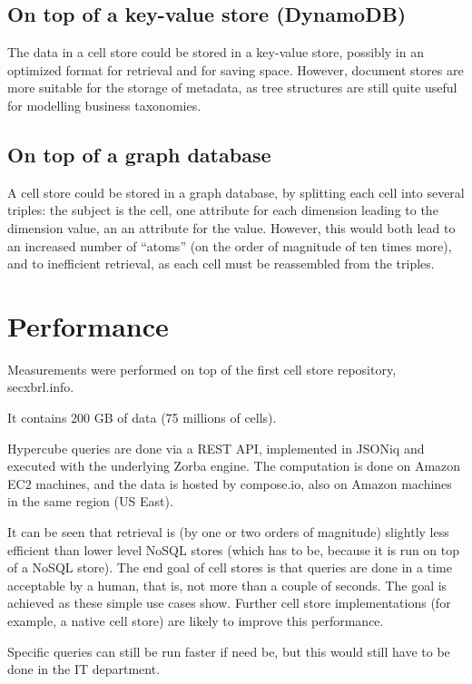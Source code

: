 \documentclass{vldb}
\begin{document}
\subsection{On top of a key-value store (DynamoDB)}

The data in a cell store could be stored in a key-value store, possibly in an optimized format for retrieval and for saving space. However, document stores are more suitable for the storage of metadata, as tree structures are still quite useful for modelling business taxonomies.

\subsection{On top of a graph database}

A cell store could be stored in a graph database, by splitting each cell into several triples: the subject is the cell, one attribute for each dimension leading to the dimension value, an an attribute for the value. However, this would both lead to an increased number of ``atoms'' (on the order of magnitude of ten times more), and to inefficient retrieval, as each cell must be reassembled from the triples.

\section{Performance}
\label{section-performance}
Measurements were performed on top of the first cell store repository, secxbrl.info.

It contains 200 GB of data (75 millions of cells).

Hypercube queries are done via a REST API, implemented in JSONiq and executed with the underlying Zorba engine. The computation is done on Amazon EC2 machines, and the data is hosted by compose.io, also on Amazon machines in the same region (US East).

It can be seen that retrieval is (by one or two orders of magnitude) slightly less efficient than lower level NoSQL stores (which has to be, because it is run on top of a NoSQL store). The end goal of cell stores is that queries are done in a time acceptable by a human, that is, not more than a couple of seconds. The goal is achieved as these simple use cases show. Further cell store implementations (for example, a native cell store) are likely to improve this performance.

Specific queries can still be run faster if need be, but this would still have to be done in the IT department.
\end{document}
